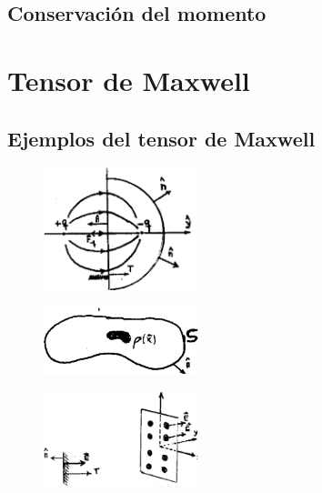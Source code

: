 \documentclass[10pt,oneside]{CBFT_book}
\begin{document}
\subsection{Conservación del momento}

\section{Tensor de Maxwell}



\subsection{Ejemplos del tensor de Maxwell}


\begin{figure}[htb]
	\begin{center}
	\includegraphics[width=0.4\textwidth]{images/fig_ft1_tensorM1.pdf}	 
	\end{center}
	\caption{}
\end{figure} 

\begin{figure}[htb]
	\begin{center}
	\includegraphics[width=0.4\textwidth]{images/fig_ft1_maxwell.pdf}	 
	\end{center}
	\caption{}
\end{figure} 


\begin{figure}[htb]
	\begin{center}
	\includegraphics[width=0.4\textwidth]{images/fig_ft1_tensorM2.pdf}	 
	\end{center}
	\caption{}
\end{figure} 
\end{document}

